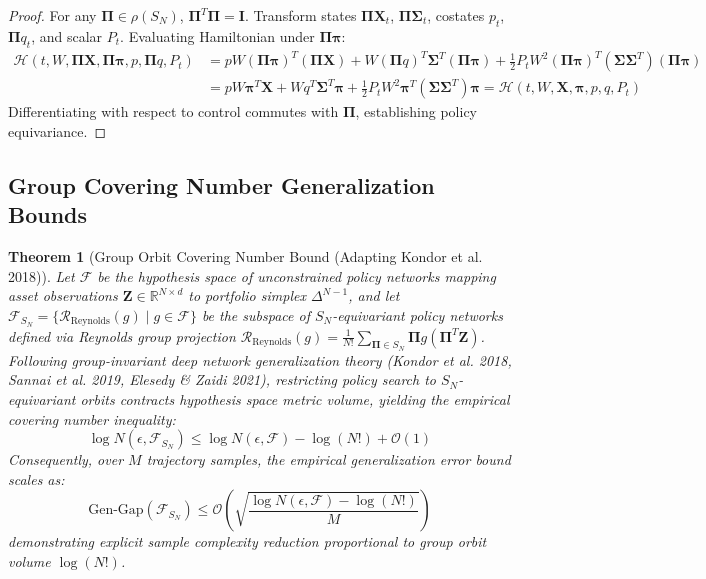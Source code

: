 \documentclass[11pt,a4paper]{article}
\theoremstyle{plain}
\newtheorem{theorem}{Theorem}[section]
\theoremstyle{definition}
\theoremstyle{remark}
\begin{document}
\begin{proof}
For any $\mathbf{\Pi} \in \rho(S_N)$, $\mathbf{\Pi}^T \mathbf{\Pi} = \mathbf{I}$. Transform states $\mathbf{\Pi}\mathbf{X}_t$, $\mathbf{\Pi}\mathbf{\Sigma}_t$, costates $p_t$, $\mathbf{\Pi}q_t$, and scalar $P_t$. Evaluating Hamiltonian under $\mathbf{\Pi}\mathbf{\pi}$:
\begin{equation}
\begin{aligned}
    \mathcal{H}(t, W, \mathbf{\Pi}\mathbf{X}, \mathbf{\Pi}\mathbf{\pi}, p, \mathbf{\Pi}q, P_t) &= p W (\mathbf{\Pi}\mathbf{\pi})^T (\mathbf{\Pi}\mathbf{X}) + W (\mathbf{\Pi}q)^T \mathbf{\Sigma}^T (\mathbf{\Pi}\mathbf{\pi}) + \frac{1}{2} P_t W^2 (\mathbf{\Pi}\mathbf{\pi})^T (\mathbf{\Sigma}\mathbf{\Sigma}^T) (\mathbf{\Pi}\mathbf{\pi}) \\
    &= p W \mathbf{\pi}^T \mathbf{X} + W q^T \mathbf{\Sigma}^T \mathbf{\pi} + \frac{1}{2} P_t W^2 \mathbf{\pi}^T (\mathbf{\Sigma} \mathbf{\Sigma}^T) \mathbf{\pi} = \mathcal{H}(t, W, \mathbf{X}, \mathbf{\pi}, p, q, P_t)
\end{aligned}
\end{equation}
Differentiating with respect to control commutes with $\mathbf{\Pi}$, establishing policy equivariance.
\end{proof}

\subsection{Group Covering Number Generalization Bounds}

\begin{theorem}[Group Orbit Covering Number Bound (Adapting Kondor et al. 2018)]
\label{thm:rademacher}
Let $\mathcal{F}$ be the hypothesis space of unconstrained policy networks mapping asset observations $\mathbf{Z} \in \mathbb{R}^{N \times d}$ to portfolio simplex $\Delta^{N-1}$, and let $\mathcal{F}_{S_N} = \{ \mathcal{R}_{\text{Reynolds}}(g) \mid g \in \mathcal{F} \}$ be the subspace of $S_N$-equivariant policy networks defined via Reynolds group projection $\mathcal{R}_{\text{Reynolds}}(g) = \frac{1}{N!} \sum_{\mathbf{\Pi} \in S_N} \mathbf{\Pi} g(\mathbf{\Pi}^T \mathbf{Z})$. Following group-invariant deep network generalization theory (Kondor et al. 2018, Sannai et al. 2019, Elesedy \& Zaidi 2021), restricting policy search to $S_N$-equivariant orbits contracts hypothesis space metric volume, yielding the empirical covering number inequality:
\begin{equation}
    \log N(\epsilon, \mathcal{F}_{S_N}) \le \log N(\epsilon, \mathcal{F}) - \log(N!) + \mathcal{O}(1)
\end{equation}
Consequently, over $M$ trajectory samples, the empirical generalization error bound scales as:
\begin{equation}
    \text{Gen-Gap}(\mathcal{F}_{S_N}) \le \mathcal{O}\left( \sqrt{\frac{\log N(\epsilon, \mathcal{F}) - \log(N!)}{M}} \right)
\end{equation}
demonstrating explicit sample complexity reduction proportional to group orbit volume $\log(N!)$.
\end{theorem}
\end{document}
